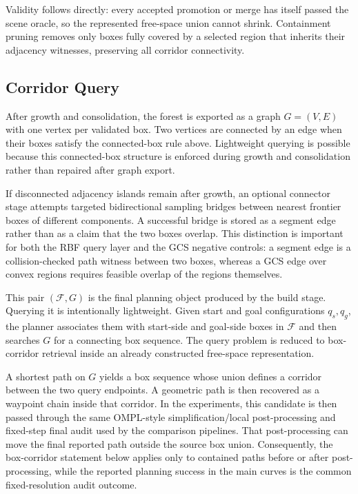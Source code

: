 \documentclass[journal]{IEEEtran}
\DeclareRobustCommand{\textsc}[1]{\textnormal{\MakeUppercase{#1}}}
\newcommand{\rbf}{\textsc{RBF}}
\begin{document}
Validity follows directly: every accepted promotion or merge has itself passed
the scene oracle, so the represented free-space union cannot shrink.
Containment pruning removes only boxes fully covered by a selected region that
inherits their adjacency witnesses, preserving all corridor connectivity.

\subsection{Corridor Query}
\label{sec:forest_graph}

After growth and consolidation, the forest is exported as a graph
$G=(V,E)$ with one vertex per validated box. Two vertices are connected by an
edge when their boxes satisfy the connected-box rule above. Lightweight querying is possible because this
connected-box structure is enforced during growth and consolidation rather
than repaired after graph export.

If disconnected adjacency islands remain after growth, an optional connector
stage attempts targeted bidirectional sampling bridges between nearest frontier boxes
of different components. A successful bridge is stored as a segment edge rather
than as a claim that the two boxes overlap. This distinction is important for
both the \rbf{} query layer and the GCS negative controls: a segment edge is a
collision-checked path witness between two boxes, whereas a GCS edge over
convex regions requires feasible overlap of the regions themselves.

This pair $(\mathcal{F},G)$ is the final planning object produced by the build
stage. Querying it is intentionally lightweight. Given start and goal
configurations $q_s,q_g$, the planner associates them with start-side and
goal-side boxes in $\mathcal{F}$ and then searches $G$ for a connecting box
sequence. The query problem is reduced to box-corridor
retrieval inside an already constructed free-space representation.

A shortest path on $G$ yields a box sequence whose union defines a corridor
between the two query endpoints. A geometric path is then recovered as a
waypoint chain inside that corridor. In the experiments, this candidate is then
passed through the same OMPL-style simplification/local post-processing and
fixed-step final audit used by the comparison pipelines. That post-processing
can move the final reported path outside the source box union. Consequently,
the box-corridor statement below applies only to contained paths before or after
post-processing, while the reported planning success in the main curves is the
common fixed-resolution audit outcome.
\end{document}
